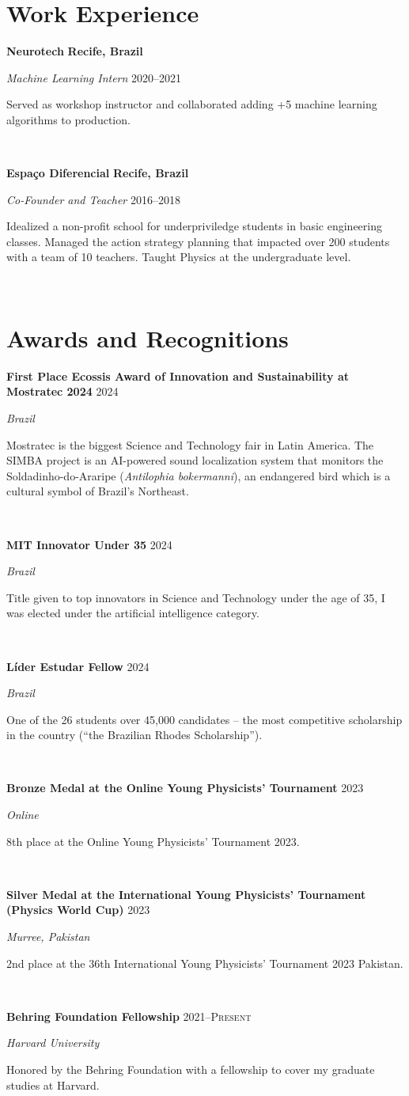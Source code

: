 \documentclass[letterpaper,10pt]{article}
\newcommand{\entry}[4]{

\begin{minipage}[t]{.15\textwidth}
\end{minipage}
\hfill\vline\hfill 
\begin{minipage}[t]{0.95\textwidth}
#2 \hfill \textsc{#1}

\textit{#3}

\footnotesize{#4}
\end{minipage}\\\vspace{.25cm}}
\newcommand{\we}[5]{

\begin{minipage}[t]{.15\textwidth}
\end{minipage}
\hfill\vline\hfill 
\begin{minipage}[t]{0.95\textwidth}
#2 \hfill \textbf{#5}

\textit{#3} \hfill \textsc{#1}

\footnotesize{#4}
\end{minipage}\\\vspace{.25cm}}
\begin{document}
\section{Work Experience}
\vspace*{.1cm}
\we{2020--2021}{\textbf{Neurotech}}{Machine Learning Intern}{
	Served as workshop instructor and collaborated adding +5 machine learning algorithms to production.
	}{Recife, Brazil}
\we{2016--2018}{\textbf{Espaço Diferencial}}{Co-Founder and Teacher}{
	Idealized a non-profit school for underpriviledge students in basic engineering classes. Managed the action strategy planning that impacted over 200 students with a team of 10 teachers. Taught Physics at the undergraduate level.
	}{Recife, Brazil}
\vspace*{-.25cm}
\section{Awards and Recognitions}
\vspace*{.1cm}

\entry{2024}{\textbf{First Place Ecossis Award of Innovation and Sustainability at Mostratec 2024}}{Brazil}{
	Mostratec is the biggest Science and Technology fair in Latin America. The SIMBA project is an AI-powered sound localization system that monitors the Soldadinho-do-Araripe (\textit{Antilophia bokermanni}), an endangered bird which is a cultural symbol of Brazil's Northeast.	
}

\entry{2024}{\textbf{MIT Innovator Under 35}}{Brazil}{
	Title given to top innovators in Science and Technology under the age of 35, I was elected under the artificial intelligence category.	
}

\entry{2024}{\textbf{Líder Estudar Fellow}}{Brazil}{
	One of the 26 students over 45,000 candidates -- the most competitive scholarship in the country (``the Brazilian Rhodes Scholarship'').	
}

\entry{2023}{\textbf{Bronze Medal at the Online Young Physicists' Tournament}}{Online}{
	8th place at the Online Young Physicists' Tournament 2023.	
}

\entry{2023}{\textbf{Silver Medal at the International Young Physicists' Tournament (Physics World Cup)}}{Murree, Pakistan}{
	2nd place at the 36th International Young Physicists' Tournament 2023 Pakistan.	
}

\entry{2021--Present}{\textbf{Behring Foundation Fellowship}}{Harvard University}{
	Honored by the Behring Foundation with a fellowship to cover my graduate studies at Harvard.	
}
\end{document}

